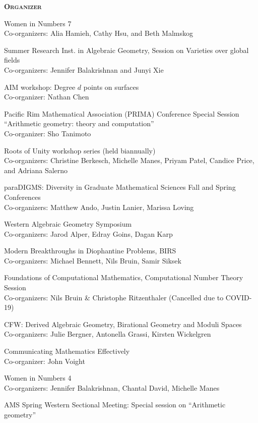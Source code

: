 \documentclass[12pt]{article}
\newenvironment{date_section}
	{
	\vspace{-1ex}
	\leftmargini = 15ex
	 \begin{itemize}[
		 labelsep = *,
		 labelwidth = 9ex,
		 labelindent = 0ex,
		 itemindent = !,
		 font=\normalfont, 
		 align=parleft
		 ]
		{}
		\itemsep=-1.5mm}
	{\end{itemize}\vspace{-2ex}}
\newcommand{\yearmo}[2]{
	\item[ 
		{\makebox[1ex][r]{#1}}
		\hspace{1ex}
		{\makebox[1ex][l]{#2} }
		] }
\newcommand{\yearrange}[2]{
	\item[ 
		{\makebox[1ex][r]{#1}}
		--
		{\makebox[1ex][l]{#2} }
		] }
\begin{document}
		\begin{date_section}
			
			\yearmo{}{}\textbf{\textsc{Organizer}}
			\yearmo{}{2026} Women in Numbers 7\\
			Co-organizers: Alia Hamieh, Cathy Hsu, and Beth Malmskog
			\yearmo{}{2025} Summer Research Inst. in Algebraic Geometry,  Session on Varieties over global fields\\
			Co-organizers: Jennifer Balakrishnan and Junyi Xie
			\yearmo{}{2024} AIM workshop: Degree $d$ points on surfaces\\
			Co-organizer: Nathan Chen
			\yearmo{}{2022} Pacific Rim Mathematical Association (PRIMA) Conference Special Session ``Arithmetic geometry: theory and computation''\\
			Co-organizer: Sho Tanimoto 
            \yearrange{2022}{}
            Roots of Unity workshop series (held biannually)\\
            Co-organizers: Christine Berkesch, Michelle Manes, Priyam Patel, Candice Price, and Adriana Salerno
            \yearrange{2020}{2022}
            paraDIGMS: Diversity in Graduate Mathematical Sciences Fall and Spring Conferences\\
                Co-organizers: Matthew Ando, Justin Lanier, Marissa Loving
            \yearmo{}{2020}
            Western Algebraic Geometry Symposium\\
                Co-organizers: Jarod Alper, Edray Goins, Dagan Karp
			\yearmo{}{}%
            Modern Breakthroughs in Diophantine Problems, BIRS\\
            Co-organizers: Michael Bennett, Nils Bruin, Samir Siksek
            \yearmo{}{}%
            Foundations of Computational Mathematics, Computational Number Theory Session\\
            Co-organizers: Nils Bruin \& Christophe Ritzenthaler (Cancelled due to COVID-19)
			\yearmo{}{2019}%
			CFW: Derived Algebraic Geometry, Birational Geometry and Moduli Spaces\\
			Co-organizers: Julie Bergner, Antonella Grassi, Kirsten Wickelgren 
			\yearmo{}{2018}%
					Communicating Mathematics Effectively\\
					Co-organizer: John Voight
			\yearmo{}{2017}%
				Women in Numbers 4\\
                Co-organizers: Jennifer Balakrishnan, Chantal David, Michelle Manes
			\yearmo{}{2015}%
				AMS Spring Western Sectional Meeting: Special session on ``Arithmetic geometry''\\

\end{date_section}
\end{document}
